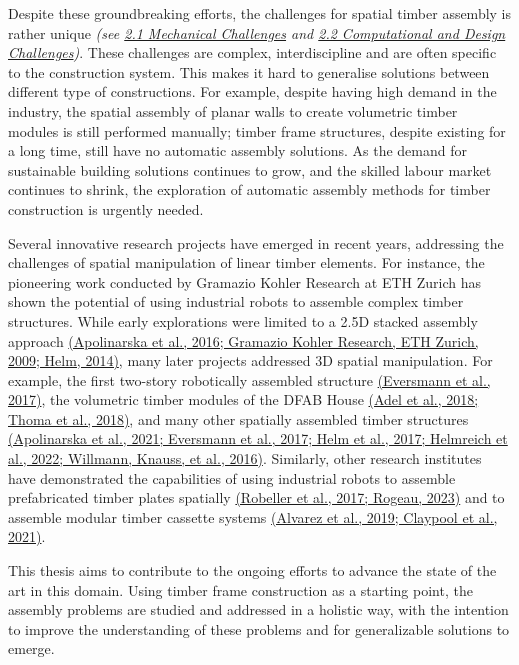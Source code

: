 \documentclass[11pt]{book}
\begin{document}
Despite these groundbreaking efforts, the challenges for spatial timber assembly is rather unique \textit{(see \uline{2.1 Mechanical Challenges} and \uline{2.2 Computational and Design Challenges})}. These challenges are complex, interdiscipline and are often specific to the construction system. This makes it hard to generalise solutions between different type of constructions. For example, despite having high demand in the industry, the spatial assembly of planar walls to create volumetric timber modules is still performed manually; timber frame structures, despite existing for a long time, still have no automatic assembly solutions. As the demand for sustainable building solutions continues to grow, and the skilled labour market continues to shrink, the exploration of automatic assembly methods for timber construction is urgently needed. 

Several innovative research projects have emerged in recent years, addressing the challenges of spatial manipulation of linear timber elements. For instance, the pioneering work conducted by Gramazio Kohler Research at ETH Zurich has shown the potential of using industrial robots to assemble complex timber structures. While early explorations were limited to a 2.5D stacked assembly approach \href{https://www.zotero.org/google-docs/?AEnhNR}{(Apolinarska et al., 2016; Gramazio Kohler Research, ETH Zurich, 2009; Helm, 2014)}, many later projects addressed 3D spatial manipulation. For example, the first two-story robotically assembled structure \href{https://www.zotero.org/google-docs/?eAx4Aa}{(Eversmann et al., 2017)}, the volumetric timber modules of the DFAB House \href{https://www.zotero.org/google-docs/?vY9d9P}{(Adel et al., 2018; Thoma et al., 2018)}, and many other spatially assembled timber structures \href{https://www.zotero.org/google-docs/?QdvzIq}{(Apolinarska et al., 2021; Eversmann et al., 2017; Helm et al., 2017; Helmreich et al., 2022; Willmann, Knauss, et al., 2016)}. Similarly, other research institutes have demonstrated the capabilities of using industrial robots to assemble prefabricated timber plates spatially \href{https://www.zotero.org/google-docs/?4viP1e}{(Robeller et al., 2017; Rogeau, 2023)} and to assemble modular timber cassette systems \href{https://www.zotero.org/google-docs/?X8rvKb}{(Alvarez et al., 2019; Claypool et al., 2021)}. 

This thesis aims to contribute to the ongoing efforts to advance the state of the art in this domain. Using timber frame construction as a starting point, the assembly problems are studied and addressed in a holistic way, with the intention to improve the understanding of these problems and for generalizable solutions to emerge.
\end{document}
